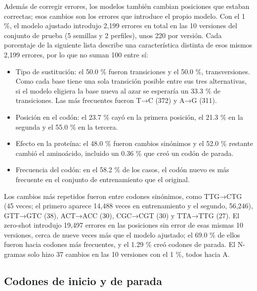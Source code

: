\documentclass[sigconf,nonacm]{acmart}
\begin{document}
Además de corregir errores, los modelos también cambian posiciones que estaban correctas; esos cambios son los errores que introduce el propio modelo. Con el 1 \%, el modelo ajustado introdujo 2,199 errores en total en las 10 versiones del conjunto de prueba (5 semillas y 2 perfiles), unos 220 por versión. Cada porcentaje de la siguiente lista describe una característica distinta de esos mismos 2,199 errores, por lo que no suman 100 entre sí:

\begin{itemize}

\item Tipo de sustitución: el 50.0 \% fueron transiciones y el 50.0 \%, transversiones. Como cada base tiene una sola transición posible entre sus tres alternativas, si el modelo eligiera la base nueva al azar se esperaría un 33.3 \% de transiciones. Las más frecuentes fueron T→C (372) y A→G (311).

\item Posición en el codón: el 23.7 \% cayó en la primera posición, el 21.3 \% en la segunda y el 55.0 \% en la tercera.

\item Efecto en la proteína: el 48.0 \% fueron cambios sinónimos y el 52.0 \% restante cambió el aminoácido, incluido un 0.36 \% que creó un codón de parada.

\item Frecuencia del codón: en el 58.2 \% de los casos, el codón nuevo es más frecuente en el conjunto de entrenamiento que el original.

\end{itemize}

Los cambios más repetidos fueron entre codones sinónimos, como TTG→CTG (45 veces; el primero aparece 14,488 veces en entrenamiento y el segundo, 56,246), GTT→GTC (38), ACT→ACC (30), CGC→CGT (30) y TTA→TTG (27). El zero-shot introdujo 19,497 errores en las posiciones sin error de esas mismas 10 versiones, cerca de nueve veces más que el modelo ajustado; el 69.0 \% de ellos fueron hacia codones más frecuentes, y el 1.29 \% creó codones de parada. El N-gramas solo hizo 37 cambios en las 10 versiones con el 1 \%, todos hacia A.

\subsection{Codones de inicio y de parada}\label{sec:res-inicio-parada}
\end{document}
